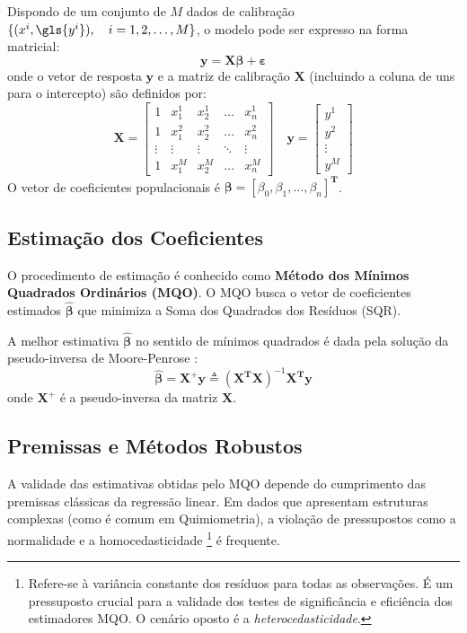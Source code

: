 Dispondo de um conjunto de $M$ dados de calibração $\{(x^i,\gls{y^i}), \quad i = 1,2,\ldots,M \}$, o modelo pode ser expresso na forma matricial:
\begin{equation}
    \mathbf{y} = \mathbf{X}\mathbf{\beta} + \mathbf{\varepsilon}
\end{equation}
onde o vetor de resposta $\mathbf{y}$ e a matriz de calibração $\mathbf{X}$ (incluindo a coluna de uns para o intercepto) são definidos por:
\begin{equation}
    \mathbf{X} =
    \left[\begin{array}{ccccc}
    1 & x_{1}^1 & x_{2}^1 & \ldots & x_{n}^1 \\
    1 & x_{1}^2 & x_{2}^2 & \ldots & x_{n}^2 \\
    \vdots & \vdots & \vdots & \ddots & \vdots \\
    1 & x_{1}^M & x_{2}^M & \ldots & x_{n}^M
    \end{array}\right]
    \quad \mathbf{y} =
    \left[\begin{array}{c}
    y^1\\y^2\\\vdots \\y^M
    \end{array}\right]
\end{equation}
O vetor de coeficientes populacionais é $\mathbf{\beta} = [\beta_0, \beta_1, \ldots, \beta_n]^{\textbf{T}}$.

\subsection{Estimação dos Coeficientes}
O procedimento de estimação é conhecido como \textbf{Método dos Mínimos Quadrados Ordinários (MQO)}. O MQO busca o vetor de coeficientes estimados $\widehat{\mathbf{\beta}}$ que minimiza a Soma dos Quadrados dos Resíduos (SQR).

A melhor estimativa $\widehat{\mathbf{\beta}}$ no sentido de mínimos quadrados é dada pela solução da pseudo-inversa de Moore-Penrose \cite{DRAPER:1998,TIMM:2002}:
\begin{equation}
    \label{eq:rlm-pseudo}
    \widehat{\mathbf{\beta}} = \mathbf{X}^+ \mathbf{y} \triangleq (\mathbf{X}^{\textbf{T}} \mathbf{X})^{-1} \mathbf{X}^{\textbf{T}} \mathbf{y}
\end{equation}
onde $\mathbf{X}^{+}$ é a pseudo-inversa da matriz $\mathbf{X}$.


\subsection{Premissas e Métodos Robustos}
A validade das estimativas obtidas pelo MQO depende do cumprimento das premissas clássicas da regressão linear. Em dados que apresentam estruturas complexas (como é comum em Quimiometria), a violação de pressupostos como a normalidade e a homocedasticidade \footnote{Refere-se à variância constante dos resíduos para todas as observações. É um pressuposto crucial para a validade dos testes de significância e eficiência dos estimadores MQO. O cenário oposto é a \textit{heterocedasticidade}.} é frequente.


